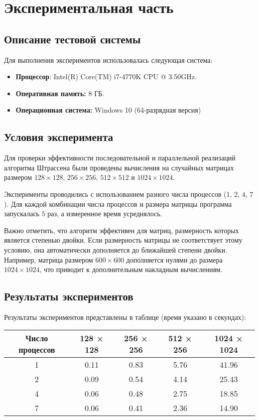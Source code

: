 \documentclass[a4paper, 14pt]{extarticle}
\begin{document}
    \newpage
    \section{Экспериментальная часть}
\subsection{Описание тестовой системы}
Для выполнения экспериментов использовалась следующая система:
\begin{itemize}
    \item \textbf{Процессор}: Intel(R) Core(TM) i7-4770K CPU @ 3.50GHz.
    \item \textbf{Оперативная память:} 8 ГБ.
    \item \textbf{Операционная система:} Windows 10 (64-разрядная версия)
\end{itemize}

\subsection{Условия эксперимента}
Для проверки эффективности последовательной и параллельной реализаций алгоритма Штрассена были проведены вычисления на случайных матрицах размером \(128 \times 128\), \(256 \times 256\), \(512 \times 512\) и \(1024 \times 1024\).  

Эксперименты проводились с использованием разного числа процессов (\(1\), \(2\), \(4\), \(7\)). Для каждой комбинации числа процессов и размера матрицы программа запускалась \(5\) раз, а измеренное время усреднялось.  

Важно отметить, что алгоритм эффективен для матриц, размерность которых является степенью двойки. Если размерность матрицы не соответствует этому условию, она автоматически дополняется до ближайшей степени двойки. Например, матрица размером \(600 \times 600\) дополняется нулями до размера \(1024 \times 1024\), что приводит к дополнительным накладным вычислениям.


\subsection{Результаты экспериментов}
Результаты экспериментов представлены в таблице (время указано в секундах):

\begin{table}[H]
\begin{tabular}{|c|c|c|c|c|}
\hline
Число процессов & 128 × 128 & 256 × 256 & 512 × 256 & 1024 × 1024 \\ \hline
1               & 0.11      & 0.83      & 5.76      & 41.96       \\ \hline
2               & 0.09      & 0.54      & 4.14      & 25.43       \\ \hline
4               & 0.06      & 0.48      & 2.75      & 18.85       \\ \hline
7               & 0.06      & 0.41      & 2.36      & 14.90       \\ \hline
\end{tabular}
\end{table}
\end{document}
